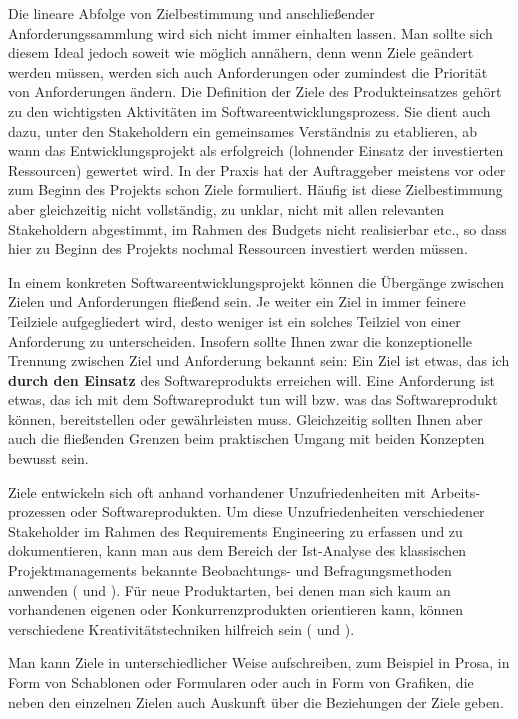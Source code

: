 Die lineare Abfolge 
von Zielbestimmung und anschließender Anforderungs\-sammlung wird sich nicht immer einhalten lassen. Man sollte sich diesem Ideal jedoch soweit wie möglich annähern, denn wenn Ziele geändert werden müssen, werden sich auch Anforderungen oder zumindest die Priorität von Anforderungen ändern. Die Definition der Ziele des Produkteinsatzes gehört zu den wichtigsten Aktivitäten im Softwareentwicklungsprozess. Sie dient auch dazu, unter den Stakeholdern ein gemeinsames Verständnis zu etablieren, ab wann das Entwicklungsprojekt als erfolgreich (lohnender Einsatz der investierten Ressourcen) gewertet wird. In der Praxis hat der Auftraggeber meistens vor oder zum Beginn des Projekts schon Ziele formuliert. Häufig ist diese Zielbestimmung aber gleichzeitig nicht vollständig, zu unklar, nicht mit allen relevanten Stakeholdern abgestimmt, im Rahmen des Budgets nicht realisierbar etc., so dass hier zu Beginn des Projekts nochmal Ressourcen investiert werden müssen.

In  einem konkreten Softwareentwicklungsprojekt können die Übergänge zwischen Zielen und Anforderungen fließend sein. Je weiter ein Ziel in immer feinere Teilziele aufgegliedert wird, desto weniger ist ein solches Teilziel von einer Anforderung zu unterscheiden. Insofern sollte Ihnen zwar die konzeptionelle Trennung zwischen Ziel und Anforderung bekannt sein: Ein Ziel ist etwas, das ich \textbf{durch den Einsatz} des Softwareprodukts erreichen will. Eine Anforderung ist etwas, das ich mit dem Softwareprodukt tun will bzw. was das Softwareprodukt können, bereitstellen oder gewährleisten muss. Gleichzeitig sollten Ihnen aber auch die fließenden Grenzen beim praktischen Umgang mit beiden Konzepten bewusst sein.

Ziele entwickeln sich oft anhand vorhandener Unzufriedenheiten mit 
Arbeits- \linebreak %
prozessen oder Softwareprodukten. Um diese Unzufriedenheiten verschiedener Stake\-holder im Rahmen des Requirements Engineering zu erfassen und zu dokumentieren, kann man aus dem Bereich der Ist-Analyse des klassischen Projektmanagements bekannte Beobachtungs- und Befragungsmethoden anwenden (\zb \cite[103 \psqq]{rup14} und \cite[135 \psqq]{som18}). Für neue Produktarten, bei denen man sich kaum an vorhandenen eigenen oder Konkurrenzprodukten orientieren kann, können verschiedene Kreativitäts\-techniken hilfreich sein (\zb \cite[S.~76 und S.~99 \psqq]{rup14} und \cite[58 \psqq]{tre18}). 

Man kann Ziele in unterschiedlicher Weise aufschreiben, zum Beispiel in Prosa, in Form von Schablonen oder Formularen oder auch in Form von Grafiken, die neben den einzelnen Zielen auch Auskunft über die Beziehungen der Ziele geben. 